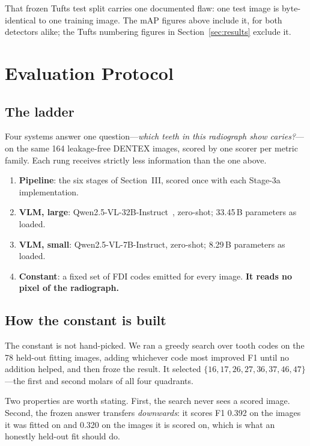 \documentclass[conference]{IEEEtran}
\begin{document}
That frozen Tufts test split carries one documented flaw: one test image is
byte-identical to one training image. The mAP figures above include it, for both
detectors alike; the Tufts numbering figures in Section~\ref{sec:results} exclude
it.

\section{Evaluation Protocol}
\label{sec:protocol}

\subsection{The ladder}
Four systems answer one question---\emph{which teeth in this radiograph show
caries?}---on the same 164 leakage-free DENTEX images, scored by one scorer per
metric family. Each rung receives strictly less information than the one above.

\begin{enumerate}
  \item \textbf{Pipeline}: the six stages of Section~III, scored once with each
        Stage-3a implementation.
  \item \textbf{VLM, large}: Qwen2.5-VL-32B-Instruct~\cite{bai2025qwen25vl},
        zero-shot; 33.45\,B parameters as loaded.
  \item \textbf{VLM, small}: Qwen2.5-VL-7B-Instruct, zero-shot; 8.29\,B
        parameters as loaded.
  \item \textbf{Constant}: a fixed set of FDI codes emitted for every image.
        \textbf{It reads no pixel of the radiograph.}
\end{enumerate}

\subsection{How the constant is built}
The constant is not hand-picked. We ran a greedy search over tooth codes on the
78 held-out fitting images, adding whichever code most improved F1 until no
addition helped, and then froze the result. It selected
$\{16,17,26,27,36,37,46,47\}$---the first and second molars of all four
quadrants.

Two properties are worth stating. First, the search never sees a scored image.
Second, the frozen answer transfers \emph{downwards}: it scores F1 0.392 on the
images it was fitted on and 0.320 on the images it is scored on, which is what an
honestly held-out fit should do.
\end{document}
